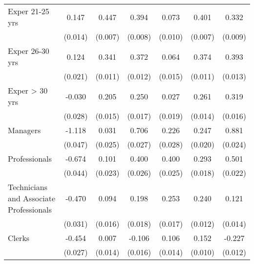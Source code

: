 \begin{table}[htbp]
\begin{tabular}{l*{6}{c}}
Exper 21-25 yrs     &       0.147\sym{***}&       0.447\sym{***}&       0.394\sym{***}&       0.073\sym{***}&       0.401\sym{***}&       0.332\sym{***}\\
                    &     (0.014)         &     (0.007)         &     (0.008)         &     (0.010)         &     (0.007)         &     (0.009)         \\
Exper 26-30 yrs     &       0.124\sym{***}&       0.341\sym{***}&       0.372\sym{***}&       0.064\sym{***}&       0.374\sym{***}&       0.393\sym{***}\\
                    &     (0.021)         &     (0.011)         &     (0.012)         &     (0.015)         &     (0.011)         &     (0.013)         \\
Exper > 30 yrs      &      -0.030         &       0.205\sym{***}&       0.250\sym{***}&       0.027         &       0.261\sym{***}&       0.319\sym{***}\\
                    &     (0.028)         &     (0.015)         &     (0.017)         &     (0.019)         &     (0.014)         &     (0.016)         \\
Managers            &      -1.118\sym{***}&       0.031         &       0.706\sym{***}&       0.226\sym{***}&       0.247\sym{***}&       0.881\sym{***}\\
                    &     (0.047)         &     (0.025)         &     (0.027)         &     (0.028)         &     (0.020)         &     (0.024)         \\
Professionals       &      -0.674\sym{***}&       0.101\sym{***}&       0.400\sym{***}&       0.400\sym{***}&       0.293\sym{***}&       0.501\sym{***}\\
                    &     (0.044)         &     (0.023)         &     (0.026)         &     (0.025)         &     (0.018)         &     (0.022)         \\
Technicians and Associate Professionals&      -0.470\sym{***}&       0.094\sym{***}&       0.198\sym{***}&       0.253\sym{***}&       0.240\sym{***}&       0.121\sym{***}\\
                    &     (0.031)         &     (0.016)         &     (0.018)         &     (0.017)         &     (0.012)         &     (0.014)         \\
Clerks              &      -0.454\sym{***}&       0.007         &      -0.106\sym{***}&       0.106\sym{***}&       0.152\sym{***}&      -0.227\sym{***}\\
                    &     (0.027)         &     (0.014)         &     (0.016)         &     (0.014)         &     (0.010)         &     (0.012)         \\

\end{tabular}
\end{table}
